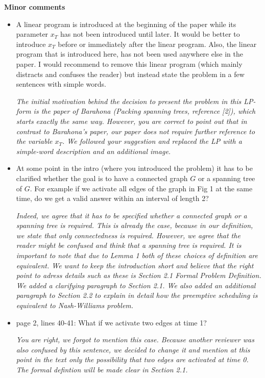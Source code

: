 \documentclass[11pt,a4paper]{article}
\begin{document}
\textbf{Minor comments}

\begin{itemize}

\item A linear program is introduced at the beginning of the paper while its parameter $x_T$ has not been introduced until later. It would be better to introduce $x_T$ before or immediately after the linear program. 
Also, the linear program that is introduced here, has not been used anywhere else in the paper. I would recommend to remove this linear program (which mainly distracts and confuses the reader) but instead state the problem in a few sentences with simple words.

\textit{The initial motivation behind the decision to present the problem in this LP-form is the paper of Barahona (Packing spanning trees, reference [2]), which starts exactly the same way. However, you are correct to point out that in contrast to Barahona's paper, our paper does not require further reference to the variable $x_T$. We followed your suggestion and replaced the LP with a simple-word description and an additional image. }

\item At some point in the intro (where you introduced the problem) it has to be clarified whether the goal is to have a connected graph $G$ or a spanning tree of $G$. For example if we activate all edges of the graph in Fig 1 at the same time, do we get a valid answer within an interval of length 2? 

\textit{ Indeed, we agree that it has to be specified whether a connected graph or a spanning tree is required. This is already the case, because in our definition, we state that only connectedness is required.  However, we agree that the reader might be confused and think that a spanning tree is required. It is important to note that due to Lemma 1 both of these choices of definition are equivalent.  We want to keep the introduction short and believe that the right point to adress details such as these is Section 2.1 Formal Problem Definition. We added a clarifying paragraph to Section 2.1. We also added an additional paragraph to Section 2.2 to explain in detail how the \emph{preemptive} scheduling is equivalent to Nash-Williams problem.}

\item page 2, lines 40-41: What if we activate two edges at time 1?

\textit{You are right, we forgot to mention this case. Because another reviewer was also confused by this sentence, we decided to change it and mention at this point in the text only the possibility that two edges are activated at time 0. The formal defintion will be made clear in Section 2.1. }


\end{itemize}
\end{document}
